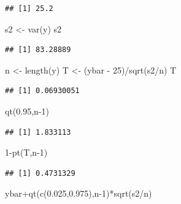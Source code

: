 \documentclass[
]{book}
\newenvironment{Shaded}{\begin{snugshade}}{\end{snugshade}}
\newcommand{\DecValTok}[1]{\textcolor[rgb]{0.00,0.00,0.81}{#1}}
\newcommand{\FloatTok}[1]{\textcolor[rgb]{0.00,0.00,0.81}{#1}}
\newcommand{\FunctionTok}[1]{\textcolor[rgb]{0.00,0.00,0.00}{#1}}
\newcommand{\NormalTok}[1]{#1}
\newcommand{\OtherTok}[1]{\textcolor[rgb]{0.56,0.35,0.01}{#1}}
\newcommand{\SpecialCharTok}[1]{\textcolor[rgb]{0.00,0.00,0.00}{#1}}
\begin{document}
\begin{verbatim}
## [1] 25.2
\end{verbatim}

\begin{Shaded}
\begin{Highlighting}[]
\NormalTok{s2 }\OtherTok{\textless{}{-}} \FunctionTok{var}\NormalTok{(y)}
\NormalTok{s2}
\end{Highlighting}
\end{Shaded}

\begin{verbatim}
## [1] 83.28889
\end{verbatim}

\begin{Shaded}
\begin{Highlighting}[]
\NormalTok{n }\OtherTok{\textless{}{-}} \FunctionTok{length}\NormalTok{(y)}
\NormalTok{T }\OtherTok{\textless{}{-}}\NormalTok{ (ybar }\SpecialCharTok{{-}} \DecValTok{25}\NormalTok{)}\SpecialCharTok{/}\FunctionTok{sqrt}\NormalTok{(s2}\SpecialCharTok{/}\NormalTok{n)}
\NormalTok{T}
\end{Highlighting}
\end{Shaded}

\begin{verbatim}
## [1] 0.06930051
\end{verbatim}

\begin{Shaded}
\begin{Highlighting}[]
\FunctionTok{qt}\NormalTok{(}\FloatTok{0.95}\NormalTok{,n}\DecValTok{{-}1}\NormalTok{)}
\end{Highlighting}
\end{Shaded}

\begin{verbatim}
## [1] 1.833113
\end{verbatim}

\begin{Shaded}
\begin{Highlighting}[]
\DecValTok{1}\SpecialCharTok{{-}}\FunctionTok{pt}\NormalTok{(T,n}\DecValTok{{-}1}\NormalTok{)}
\end{Highlighting}
\end{Shaded}

\begin{verbatim}
## [1] 0.4731329
\end{verbatim}

\begin{Shaded}
\begin{Highlighting}[]
\NormalTok{ybar}\SpecialCharTok{+}\FunctionTok{qt}\NormalTok{(}\FunctionTok{c}\NormalTok{(}\FloatTok{0.025}\NormalTok{,}\FloatTok{0.975}\NormalTok{),n}\DecValTok{{-}1}\NormalTok{)}\SpecialCharTok{*}\FunctionTok{sqrt}\NormalTok{(s2}\SpecialCharTok{/}\NormalTok{n)}
\end{Highlighting}
\end{Shaded}
\end{document}
